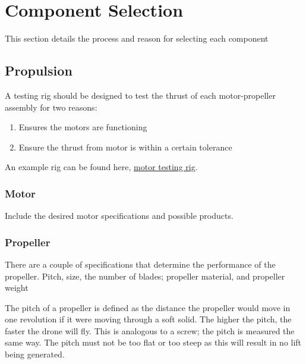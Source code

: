 \chapter{Component Selection}
This section details the process and reason for selecting each component
\section{Propulsion}

A testing rig should be designed to test the thrust of each motor-propeller assembly for two reasons:
\begin{enumerate}
	
	\item Ensures the motors are functioning
	\item Ensure the thrust from motor is within a certain tolerance
	
\end{enumerate}

An example rig can be found here, \href{https://www.banggood.com/Mayatech-MT10-10KG-Motor-Thrust-Tester-Propeller-Power-Tension-Measurement-For-RC-Model-Racing-Drone-p-1442104.html?gmcCountry=CA&currency=CAD&createTmp=1&utm_source=googleshopping&utm_medium=cpc_bgs&utm_content=yixuan&utm_campaign=ssc-ca-en-0213&gclid=CjwKCAjwmKLzBRBeEiwACCVihhjP9RAx65sLv2OFui5eUaMqfx3rBVgE6KZotZjVDXiZH75DfHi8yRoCh1EQAvD_BwE&cur_warehouse=CN}{motor testing rig}.

\subsection{Motor}
Include the desired motor specifications and possible products.
\subsection{Propeller}
There are a couple of specifications that determine the performance of the propeller. Pitch, size, the number of blades; propeller material, and propeller weight \cite{droneomega}

The pitch of a propeller is defined as the distance the propeller would move in one revolution if it were moving through a soft solid. The higher the pitch, the faster the drone will fly. This is analogous to a screw; the pitch is measured the same way. The pitch must not be too flat or too steep as this will result in no lift being generated. 

